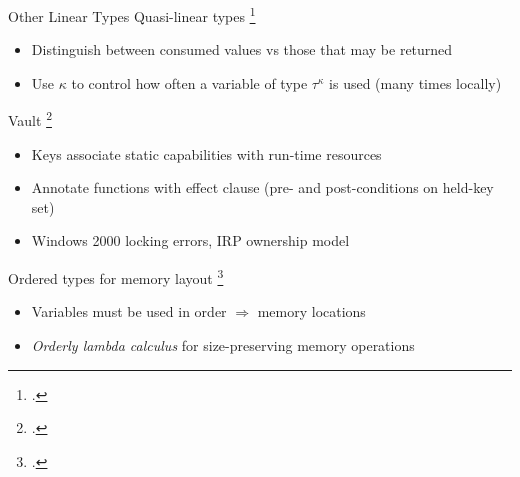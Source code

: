 \documentclass[aspectratio=169]{beamer}
\begin{document}
\begin{frame}{Other Linear Types}
  Quasi-linear types \footcite{kobayashi_quasi-linear_1999} %
    \vspace{-0.09in}
    \begin{itemize}
        \item Distinguish between consumed values vs those that may be returned
        \item Use $\kappa$ to control how often a variable of type $\tau^{\kappa}$ is used (many times locally)
    \end{itemize}
\pause
  Vault \footcite{deline_enforcing_2001} %
    \vspace{-0.09in}
    \begin{itemize}
        \item Keys associate static capabilities with run-time resources %
        \item Annotate functions with effect clause (pre- and post-conditions on held-key set)
        \item Windows 2000 locking errors, IRP ownership model %
    \end{itemize}
\pause
  Ordered types for memory layout \footcite{petersen_type_2003}
    \vspace{-0.09in}
    \begin{itemize}
        \item Variables must be used in order $\Rightarrow$ memory locations  %
        \item \emph{Orderly lambda calculus} for size-preserving memory operations 
    \end{itemize}
  \vspace{0.2in}
\end{frame}
\end{document}
